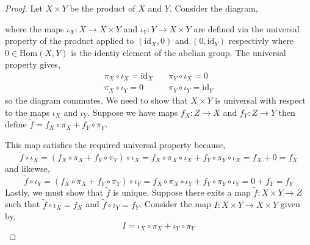 \documentclass[12pt]{article}
\newcommand{\id}{\mathrm{id}}
\newcommand{\Hom}[2]{\mathrm{Hom}\left(#1, #2 \right)}
\theoremstyle{remark}
\theoremstyle{definition}
\begin{document}
\begin{proof}
Let $X \times Y$ be the product of $X$ and $Y$. Consider the diagram,
\begin{center}
\end{center}
where the maps $\iota_X : X \to X \times Y$ and $\iota_Y : Y \to X \times Y$ are defined via the universal property of the product applied to $(\id_X, 0)$ and $(0, \id_Y)$ respectivly where $0 \in \Hom{X}{Y}$ is the identiy element of the abelian group. The universal property gives,
\begin{align*}
\pi_X \circ \iota_X = \id_X &\quad \pi_Y \circ \iota_X = 0
\\
\pi_X \circ \iota_Y = 0 &\quad \pi_Y \circ \iota_Y = \id_Y 
\end{align*}
so the diagram commutes. We need to show that $X \times Y$ is universal with respect to the maps $\iota_X$ and $\iota_Y$. Suppose we have maps $f_X : Z \to X$ and $f_Y : Z \to Y$ then define $\tilde{f} = f_X \circ \pi_X + f_Y \circ \pi_Y$.
\begin{center}
\end{center}
This map satisfies the required universal property because,
\[ \tilde{f} \circ \iota_X = (f_X \circ \pi_X + f_Y \circ \pi_Y) \circ \iota_X = f_X \circ \pi_X \circ \iota_X + f_Y \circ \pi_Y \circ \iota_X = f_X + 0 = f_X \]
and likewse,
\[ \tilde{f} \circ \iota_Y = (f_X \circ \pi_X + f_Y \circ \pi_Y) \circ \iota_Y = f_X \circ \pi_X \circ \iota_Y + f_Y \circ \pi_Y \circ \iota_Y = 0 + f_Y = f_Y \]
Lastly, we must show that $\tilde{f}$ is unique. Suppose there exits a map $\tilde{f} : X \times Y \to Z$ such that $\tilde{f} \circ \iota_X = f_X$ and $\tilde{f} \circ \iota_Y = f_Y$. Consider the map $I : X \times Y \to X \times Y$ given by,
\[ I = \iota_X \circ \pi_X + \iota_Y \circ \pi_Y \]

\end{proof}
\end{document}
